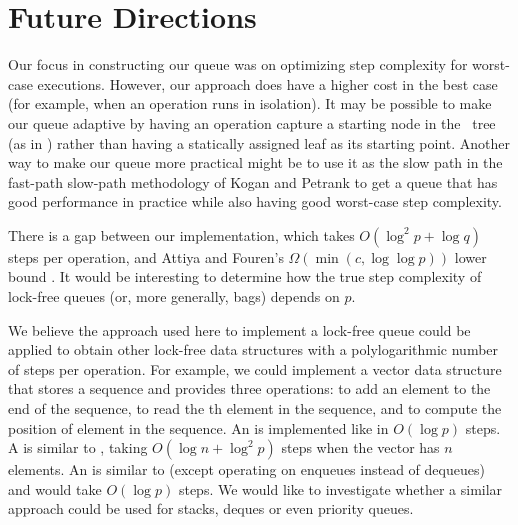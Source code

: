 
\section{Future Directions}

Our focus in constructing our queue was on optimizing step complexity for worst-case executions.
However, our approach does have a higher cost in the best case (for example, when an operation
runs in isolation).
It may be possible to make our queue adaptive by having an operation capture a starting node
in the \ordering\ tree (as in \cite{DBLP:conf/stoc/AfekDT95}) rather than having a statically assigned leaf as its starting point.
Another way to make our queue more practical might be to use it as the slow path in the
fast-path slow-path methodology of Kogan and Petrank \cite{10.1145/2370036.2145835} to
get a queue that has good performance in practice while also having good worst-case step complexity.

There is a gap between our implementation, which takes $O(\log^2 p + \log q)$ steps per operation,
and Attiya and Fouren's $\Omega(\min(c,\log\log p))$ lower bound \cite{DBLP:conf/opodis/AttiyaF17}.
It would be interesting to determine how the true step complexity of lock-free queues (or, more generally, bags)
depends on $p$.

We believe the approach used here to implement a lock-free queue 
could be applied to obtain other lock-free
data structures with a polylogarithmic number of steps per operation.
For example, we could implement a  vector data structure that stores a sequence and
provides three operations:  to add an element  to the end of the sequence,
 to read the th element in the sequence, and
 to compute the position of element  in the sequence.
An  is implemented like  in $O(\log p)$ steps.  
A  is similar to , taking $O(\log n + \log^2p)$ steps when the vector has $n$ elements.  
An  is similar to  (except operating on enqueues instead of dequeues) and would take $O(\log p)$ steps.
We would like to investigate whether a similar approach could be used for stacks, deques or even priority queues.

